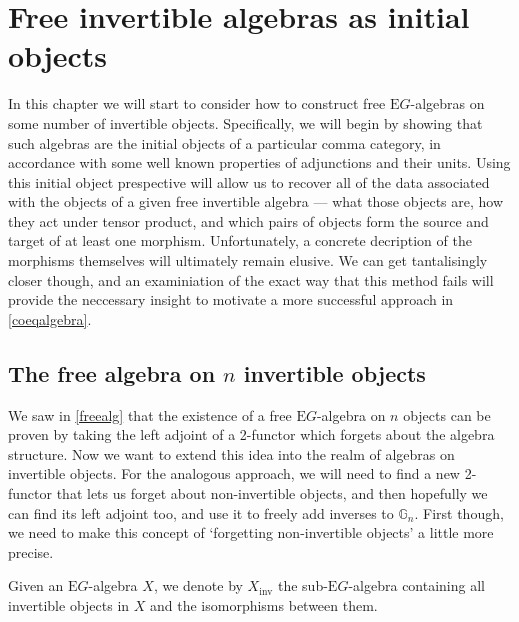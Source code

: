 \chapter{Free invertible algebras as initial objects}
\label{initialalgebra}

In this chapter we will start to consider how to construct free $\mathrm{E}G$-algebras on some number of invertible objects. Specifically, we will begin by showing that such algebras are the initial objects of a particular comma category, in accordance with some well known properties of adjunctions and their units. Using this initial object prespective will allow us to recover all of the data associated with the objects of a given free invertible algebra --- what those objects are, how they act under tensor product, and which pairs of objects form the source and target of at least one morphism. Unfortunately, a concrete decription of the morphisms themselves will ultimately remain elusive. We can get tantalisingly closer though, and an examiniation of the exact way that this method fails will provide the neccessary insight to motivate a more successful approach in \cref{coeqalgebra}.

\section{The free algebra on $n$ invertible objects}

We saw in \cref{freealg} that the existence of a free $\mathrm{E}G$-algebra on $n$ objects can be proven by taking the left adjoint of a 2-functor which forgets about the algebra structure. Now we want to extend this idea into the realm of algebras on invertible objects. For the analogous approach, we will need to find a new 2-functor that lets us forget about non-invertible objects, and then hopefully we can find its left adjoint too, and use it to freely add inverses to $\mathbb{G}_n$. First though, we need to make this concept of `forgetting non-invertible objects' a little more precise.

\begin{defn} Given an $\mathrm{E}G$-algebra $X$, we denote by $X_{\mathrm{inv}}$ the sub-$\mathrm{E}G$-algebra containing all invertible objects in $X$ and the isomorphisms between them. \end{defn}

